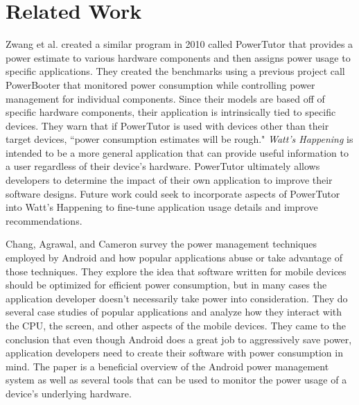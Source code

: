 \section{Related Work}
\label{sec:related}
Zwang et al.\cite{Zhang:2010:AOP:1878961.1878982} created a similar program in 2010 called PowerTutor that provides a power estimate to various hardware components and then assigns power usage to specific applications.  
They created the benchmarks using a previous project call PowerBooter that monitored power consumption while controlling power management for individual components. 
Since their models are based off of specific hardware components, their application is intrinsically tied to specific devices.
They warn that if PowerTutor is used with devices other than their target devices, ``power consumption estimates will be rough."
\emph{Watt's Happening} is intended to be a more general application that can provide useful information to a user regardless of their device's hardware. 
PowerTutor ultimately allows developers to determine the impact of their own application to improve their software designs.  
Future work could seek to incorporate aspects of PowerTutor into Watt's Happening to fine-tune application usage details and improve recommendations.

Chang, Agrawal, and Cameron survey the power management techniques employed by Android and how popular applications abuse or take advantage of those techniques\cite{energy-aware}. 
They explore the idea that software written for mobile devices should be optimized for efficient power consumption, but in many cases the application developer doesn't necessarily take power into consideration. 
They do several case studies of popular applications and analyze how they interact with the CPU, the screen, and other aspects of the mobile devices. 
They came to the conclusion that even though Android does a great job to aggressively save power, application developers need to create their software with power consumption in mind. 
The paper is a beneficial overview of the Android power management system as well as several tools that can be used to monitor the power usage of a device's underlying hardware. 


